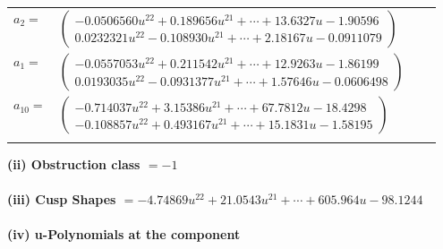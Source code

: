 \documentclass[1p]{elsarticle_modified}
\theoremstyle{definition}
\begin{document}
\begin{tabular}{m{7pt} m{180pt} m{7pt} m{180pt} }
\flushright $a_{2}=$&$\begin{pmatrix}-0.0506560 u^{22}+0.189656 u^{21}+\cdots+13.6327 u-1.90596\\0.0232321 u^{22}-0.108930 u^{21}+\cdots+2.18167 u-0.0911079\end{pmatrix}$ \\
\flushright $a_{1}=$&$\begin{pmatrix}-0.0557053 u^{22}+0.211542 u^{21}+\cdots+12.9263 u-1.86199\\0.0193035 u^{22}-0.0931377 u^{21}+\cdots+1.57646 u-0.0606498\end{pmatrix}$ \\
\flushright $a_{10}=$&$\begin{pmatrix}-0.714037 u^{22}+3.15386 u^{21}+\cdots+67.7812 u-18.4298\\-0.108857 u^{22}+0.493167 u^{21}+\cdots+15.1831 u-1.58195\end{pmatrix}$\\&\end{tabular}
\flushleft \textbf{(ii) Obstruction class $= -1$}\\~\\
\flushleft \textbf{(iii) Cusp Shapes $= -4.74869 u^{22}+21.0543 u^{21}+\cdots+605.964 u-98.1244$}\\~\\
\newpage\renewcommand{\arraystretch}{1}
\flushleft \textbf{(iv) u-Polynomials at the component}\newline \\
\end{document}
